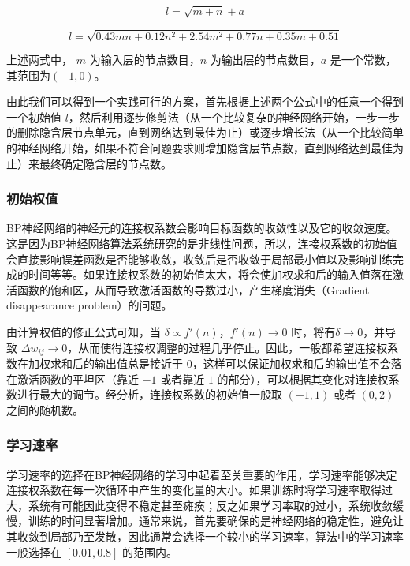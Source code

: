 \documentclass[UTF8]{ctexart}
\begin{document}
\begin{equation}
l = \sqrt{m+n} +a
\end{equation}

\begin{equation}
l = \sqrt{0.43mn + 0.12n^2+ 2.54m^2+0.77n+0.35m+0.51}
\end{equation}

上述两式中， $m$ 为输入层的节点数目，$n$ 为输出层的节点数目，$a$ 是一个常数，其范围为$(-1,0)$。 \par

由此我们可以得到一个实践可行的方案，首先根据上述两个公式中的任意一个得到一个初始值 $l$，然后利用逐步修剪法（从一个比较复杂的神经网络开始，一步一步的删除隐含层节点单元，直到网络达到最佳为止）或逐步增长法（从一个比较简单的神经网络开始，如果不符合问题要求则增加隐含层节点数，直到网络达到最佳为止）来最终确定隐含层的节点数。

\subsubsection{初始权值}

BP神经网络的神经元的连接权系数会影响目标函数的收敛性以及它的收敛速度。这是因为BP神经网络算法系统研究的是非线性问题，所以，连接权系数的初始值会直接影响误差函数是否能够收敛，收敛后是否收敛于局部最小值以及影响训练完成的时间等等。如果连接权系数的初始值太大，将会使加权求和后的输入值落在激活函数的饱和区，从而导致激活函数的导数过小，产生梯度消失（Gradient disappearance problem）的问题。 \par

由计算权值的修正公式可知，当 $\delta \propto f'(n)$，$f'(n) \to 0$ 时，将有$\delta \to 0$，并导致 $\Delta w_{ij} \to 0$，从而使得连接权调整的过程几乎停止。因此，一般都希望连接权系数在加权求和后的输出值总是接近于 $0$，这样可以保证加权求和后的输出值不会落在激活函数的平坦区（靠近 $-1$ 或者靠近 $1$ 的部分），可以根据其变化对连接权系数进行最大的调节。经分析，连接权系数的初始值一般取 $(-1,1)$ 或者 $(0,2)$ 之间的随机数。

\subsubsection{学习速率}

学习速率的选择在BP神经网络的学习中起着至关重要的作用，学习速率能够决定连接权系数在每一次循环中产生的变化量的大小。如果训练时将学习速率取得过大，系统有可能因此变得不稳定甚至瘫痪；反之如果学习率取的过小，系统收敛缓慢，训练的时间显著增加。通常来说，首先要确保的是神经网络的稳定性，避免让其收敛到局部乃至发散，因此通常会选择一个较小的学习速率，算法中的学习速率一般选择在 $[0.01,0.8]$ 的范围内。
\end{document}
